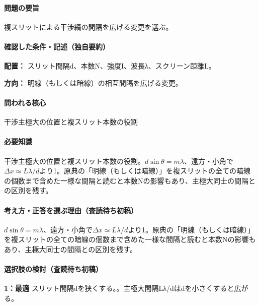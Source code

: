 \paragraph{問題の要旨} 複スリットによる干渉縞の間隔を広げる変更を選ぶ。

\paragraph{確認した条件・記述（独自要約）}\mbox{}\par

\noindent\textbf{配置：} スリット間隔d、本数N、強度I、波長λ、スクリーン距離L。\par

\noindent\textbf{方向：} 明線（もしくは暗線）の相互間隔を広げる変更。\par

\paragraph{問われる核心} 干渉主極大の位置と複スリット本数の役割

\paragraph{必要知識} 干渉主極大の位置と複スリット本数の役割。\(d\sin\theta=m\lambda\)、遠方・小角で\(\Delta x\simeq L\lambda/d\)より1。原典の「明線（もしくは暗線）」を複スリットの全ての暗線の個数まで含めた一様な間隔と読むと本数Nの影響もあり、主極大同士の間隔との区別を残す。

\paragraph{考え方・正答を選ぶ理由（査読待ち初稿）} \(d\sin\theta=m\lambda\)、遠方・小角で\(\Delta x\simeq L\lambda/d\)より1。原典の「明線（もしくは暗線）」を複スリットの全ての暗線の個数まで含めた一様な間隔と読むと本数Nの影響もあり、主極大同士の間隔との区別を残す。

\paragraph{選択肢の検討（査読待ち初稿）}\mbox{}\par

\noindent\textbf{1：最適} スリット間隔dを狭くする。。主極大間隔Lλ/dはdを小さくすると広がる。\par

